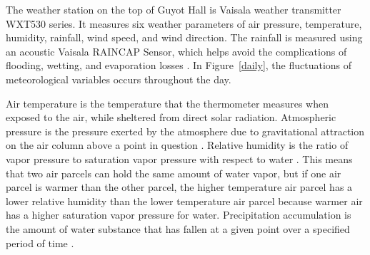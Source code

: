 \documentclass[11pt]{report}
\begin{document}
% 

The weather station on the top of Guyot Hall is Vaisala weather transmitter
WXT530 series. It measures six weather parameters of air pressure,
temperature, humidity, rainfall, wind speed, and wind direction. The
rainfall is measured using an acoustic Vaisala RAINCAP Sensor, which helps
avoid the complications of flooding, wetting, and evaporation losses
\cite[]{Vaisala}. In Figure~\ref{daily}, the fluctuations of 
meteorological variables occurs throughout the day.   

Air temperature is the temperature that the thermometer measures when
exposed to the air, while sheltered from direct solar radiation.
Atmospheric pressure is the pressure exerted by the atmosphere due to
gravitational attraction on the air column above a point in question
\cite[]{AMS}. Relative humidity is the ratio of vapor pressure to saturation
vapor pressure with respect to water \cite[]{AMS}.  This means that two air
parcels can hold the same amount of water vapor, but if one air parcel is
warmer than the other parcel, the higher temperature air parcel has a lower
relative humidity than the lower temperature air parcel because warmer air
has a higher saturation vapor pressure for water.  Precipitation
accumulation is the amount of water substance that has fallen at a given
point over a specified period of time \cite[]{AMS}.

\end{document}
